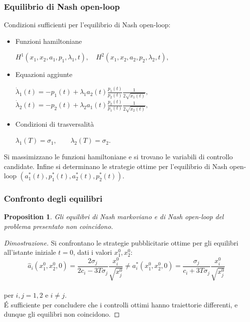 \documentclass{beamer}
\theoremstyle{plain}
\newtheorem{prop}{Proposition}[section]
\theoremstyle{definition}
\begin{document}
\begin{frame}
\frametitle{Equilibrio di Nash open-loop}
Condizioni sufficienti per l'equilibrio di Nash open-loop: 
\begin{itemize}
    \item Funzioni hamiltoniane
    \begin{center} $H^1(x_1, x_2, a_1, p_1, \lambda_1, t), \quad 
    H^2(x_1, x_2, a_2, p_2,\lambda_2, t),$ \end{center}
    \item Equazioni aggiunte \begin{center}$\dot{\lambda}_1(t) = - p_1(t) + \lambda_1 a_2(t) \frac{p_1(t)}{p_2(t)} \frac{1}{2 \sqrt{x_1(t)}},$ \\ 
    $\dot{\lambda}_2(t) = - p_2(t) + \lambda_2 a_1(t) \frac{p_2(t)}{p_1(t)} \frac{1}{2 \sqrt{x_2(t)}},$
    \end{center}
    \item Condizioni di trasversalità \\
    \begin{center}$\lambda_1(T) = \sigma_1, \qquad \lambda_2(T) = \sigma_2$.\end{center}
\end{itemize}
Si massimizzano le funzioni hamiltoniane e si trovano le variabili di controllo candidate. Infine si determinano le strategie ottime per l'equilibrio di Nash open-loop $(a_1^*(t), p_1^*(t), a_2^*(t), p_2^*(t))$.
\end{frame}

\begin{frame}
\frametitle{Confronto degli equilibri}

\begin{prop}
Gli equilibri di Nash markoviano e di Nash open-loop del problema presentato non coincidono.
\end{prop}
\begin{proof}[Dimostrazione]
Si confrontano le strategie pubblicitarie ottime per gli equilibri all'istante iniziale $t=0$, dati i valori $x_1^0, x_2^0$: 
\footnotesize
    \[\hat{a}_i(x_1^0, x_2^0, 0) = \frac{2 \sigma_j}{2 c_i - 3T\sigma_j} \frac{x_i^0}{\sqrt{x_j^0}}  \neq 
    a_i^*(x_1^0, x_2^0, 0) = \frac{\sigma_j}{c_i + 3T \sigma_j} \frac{x_i^0}{\sqrt{x_j^0}}\] \\
    \normalsize
per $i,j=1,2$ e $i \neq j$. \\
\'E sufficiente per concludere che i controlli ottimi hanno traiettorie differenti, e dunque gli equilibri non coincidono. %

\end{proof}

\end{frame}
\end{document}
